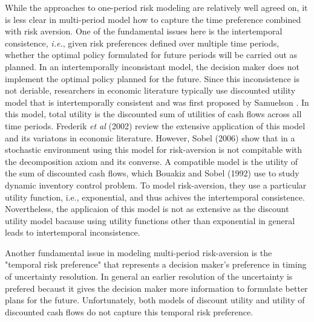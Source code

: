\documentclass[mnsc,nonblindrev,copyedit]{informs2_wz} %
\newcommand{\OUT}[1]{}
\begin{document}
\OUT{
as well as in operations management, see Echkout and {\it et al.} \cite{Eeckhoudt1995}  and Van Mieghem (2007).  Many of the papers use the exponential utility function in order to provide closed-form solutions for their model, see Gerber and Pafumi \cite{Gerber1998}.
Other papers concentrate specifically on studying risk averseness without financial hedgings.  
}

While the approaches to one-period risk modeling are relatively well agreed on, it is less clear in multi-period model how to capture the time preference combined with risk aversion.  One of the fundamental issues here is the intertemporal consistence, {\it i.e.}, given risk preferences defined over multiple time periods, whether the optimal policy formulated for future periods will be carried out as planned.  In an intertemporally inconsistant model, the decision maker does not implement the optimal policy planned for the future. Since this inconsistence is not deriable, researchers in economic literature typically use discounted utility model that is intertemporally consistent and was first proposed by Samuelson \cite{Samuelson1937}. In this model, total utility is the discounted sum of utilities of cash flows across all time periods. Frederik {\it et al} (2002) review the extensive application of this model and its variatons in economic literature. However, Sobel (2006) show that in a stochastic environment using this model for risk-aversion is not compitable with the decomposition axiom and its converse. A compatible model is the utility of the sum of discounted cash flows, which Bouakiz and Sobel (1992) use to study dynamic inventory control problem. To model risk-aversion, they use a particular utility function, i.e., exponential, and thus achives the intertemporal consistence.  Novertheless, the applicaion of this model is not as extensive as the discount utility model bacause using utility functions other than exponential in general leads to intertemporal inconsistence.

Another fundamental issue in modeling multi-period risk-aversion is the "temporal risk preference" that represents a decision maker's preference in timing of uncertainty resolution. In general an earlier resolution of the uncertainty is prefered becaust it gives the decision maker more information to formulate better plans for the future. Unfortunately, both models of discount utility and utility of discounted cash flows do not capture this temporal risk preference. 
\end{document}
